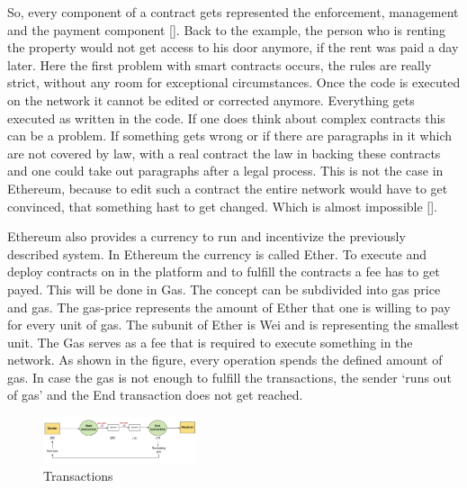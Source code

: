 So, every component of a contract gets represented the enforcement, management and the payment component [].
Back to the example, the person who is renting the property would not get access to his door anymore, if the rent was paid a day later. 
Here the first problem with smart contracts occurs, the rules are really strict, without any room for exceptional circumstances. 
Once the code is executed on the network it cannot be edited or corrected anymore. 
Everything gets executed as written in the code. 
If one does think about complex contracts this can be a problem.
If something gets wrong or if there are paragraphs in it which are not covered by law, with a real contract the law in backing these contracts and one could take out paragraphs after a legal process.
This is not the case in Ethereum, because to edit such a contract the entire network would have to get convinced, that something hast to get changed. Which is almost impossible [].

Ethereum also provides a currency to run and incentivize the previously described system. 
In Ethereum the currency is called Ether. 
To execute and deploy contracts on in the platform and to fulfill the contracts a fee has to get payed.
This will be done in Gas. The concept can be subdivided into gas price and gas. 
The gas-price represents the amount of Ether that one is willing to pay for every unit of gas. 
The subunit of Ether is Wei and is representing the smallest unit. 
The Gas serves as a fee that is required to execute something in the network. 
As shown in the figure, every operation spends the defined amount of gas. 
In case the gas is not enough to fulfill the transactions, the sender ‘runs out of gas’ and the End transaction does not get reached. 

\begin{figure}
\caption{Transactions} 
\includegraphics[width=0.4\textwidth]{gastransactions}
\end{figure}

